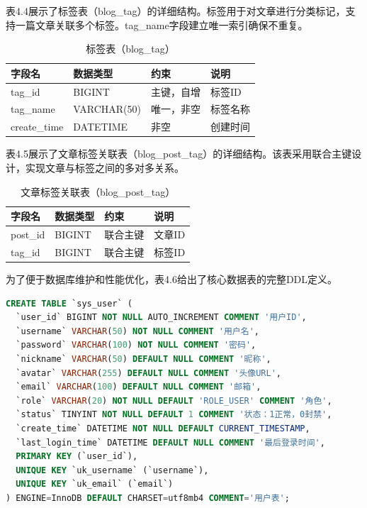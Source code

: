 \documentclass[UTF8,AutoFakeBold=1,AutoFakeSlant,zihao=-4]{SCAU}
\begin{document}
表4.4展示了标签表（blog\_tag）的详细结构。标签用于对文章进行分类标记，支持一篇文章关联多个标签。tag\_name字段建立唯一索引确保不重复。

\begin{table}[htbp]
\centering
\caption{标签表（blog\_tag）}
\begin{tabular}{p{2.2cm}p{2.5cm}p{2cm}p{4.5cm}}
\toprule
字段名 & 数据类型 & 约束 & 说明 \\
\midrule
tag\_id & BIGINT & 主键，自增 & 标签ID \\
tag\_name & VARCHAR(50) & 唯一，非空 & 标签名称 \\
create\_time & DATETIME & 非空 & 创建时间 \\
\bottomrule
\end{tabular}
\end{table}

表4.5展示了文章标签关联表（blog\_post\_tag）的详细结构。该表采用联合主键设计，实现文章与标签之间的多对多关系。

\begin{table}[htbp]
\centering
\caption{文章标签关联表（blog\_post\_tag）}
\begin{tabular}{p{2.2cm}p{2.5cm}p{2cm}p{4.5cm}}
\toprule
字段名 & 数据类型 & 约束 & 说明 \\
\midrule
post\_id & BIGINT & 联合主键 & 文章ID \\
tag\_id & BIGINT & 联合主键 & 标签ID \\
\bottomrule
\end{tabular}
\end{table}

为了便于数据库维护和性能优化，表4.6给出了核心数据表的完整DDL定义。

\begin{table}[htbp]
\centering
\caption{用户表DDL脚本}
\label{tab:user-ddl}
\begin{lstlisting}[language=sql]
CREATE TABLE `sys_user` (
  `user_id` BIGINT NOT NULL AUTO_INCREMENT COMMENT '用户ID',
  `username` VARCHAR(50) NOT NULL COMMENT '用户名',
  `password` VARCHAR(100) NOT NULL COMMENT '密码',
  `nickname` VARCHAR(50) DEFAULT NULL COMMENT '昵称',
  `avatar` VARCHAR(255) DEFAULT NULL COMMENT '头像URL',
  `email` VARCHAR(100) DEFAULT NULL COMMENT '邮箱',
  `role` VARCHAR(20) NOT NULL DEFAULT 'ROLE_USER' COMMENT '角色',
  `status` TINYINT NOT NULL DEFAULT 1 COMMENT '状态：1正常，0封禁',
  `create_time` DATETIME NOT NULL DEFAULT CURRENT_TIMESTAMP,
  `last_login_time` DATETIME DEFAULT NULL COMMENT '最后登录时间',
  PRIMARY KEY (`user_id`),
  UNIQUE KEY `uk_username` (`username`),
  UNIQUE KEY `uk_email` (`email`)
) ENGINE=InnoDB DEFAULT CHARSET=utf8mb4 COMMENT='用户表';
\end{lstlisting}
\end{table}
\end{document}
